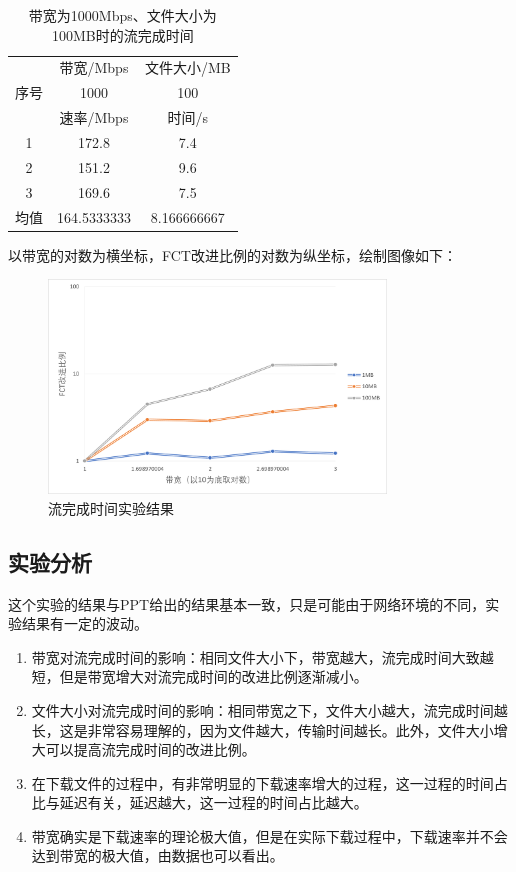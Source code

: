 \documentclass[UTF8]{article}
\begin{document}
\begin{table}[H]
  \centering
  \caption{带宽为1000Mbps、文件大小为100MB时的流完成时间}
  \begin{tabular}{|c|c|c|}
    \hline
    \multirow{3}{*}{序号}&带宽/Mbps&文件大小/MB\\
    \cline{2-3}
    &1000&100\\
    \cline{2-3}
    &速率/Mbps&时间/s\\
    \hline
    1&172.8&7.4\\
    \hline
    2&151.2&9.6\\
    \hline
    3&169.6&7.5\\
    \hline
    均值&164.5333333&8.166666667\\
    \hline
  \end{tabular}
\end{table}

以带宽的对数为横坐标，FCT改进比例的对数为纵坐标，绘制图像如下：

\begin{figure}[H]
  \centering
  \includegraphics[width=0.8\textwidth]{result2.png}
  \caption{流完成时间实验结果}
\end{figure}

\subsection{实验分析}

这个实验的结果与PPT给出的结果基本一致，只是可能由于网络环境的不同，实验结果有一定的波动。

\begin{enumerate}
  \item 带宽对流完成时间的影响：相同文件大小下，带宽越大，流完成时间大致越短，但是带宽增大对流完成时间的改进比例逐渐减小。
  \item 文件大小对流完成时间的影响：相同带宽之下，文件大小越大，流完成时间越长，这是非常容易理解的，因为文件越大，传输时间越长。此外，文件大小增大可以提高流完成时间的改进比例。
  \item 在下载文件的过程中，有非常明显的下载速率增大的过程，这一过程的时间占比与延迟有关，延迟越大，这一过程的时间占比越大。
  \item 带宽确实是下载速率的理论极大值，但是在实际下载过程中，下载速率并不会达到带宽的极大值，由数据也可以看出。
\end{enumerate}
\end{document}
